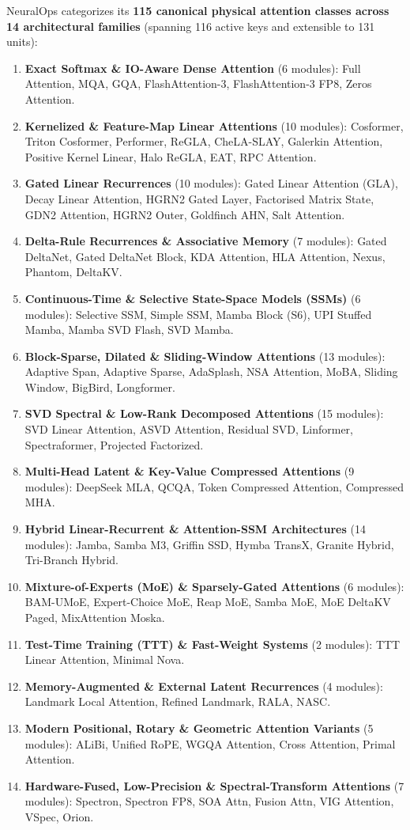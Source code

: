 \documentclass{article}
\begin{document}
NeuralOps categorizes its \textbf{115 canonical physical attention classes across 14 architectural families} (spanning 116 active keys and extensible to 131 units):
\begin{enumerate}
    \item \textbf{Exact Softmax \& IO-Aware Dense Attention} (6 modules): Full Attention, MQA, GQA, FlashAttention-3, FlashAttention-3 FP8, Zeros Attention.
    \item \textbf{Kernelized \& Feature-Map Linear Attentions} (10 modules): Cosformer, Triton Cosformer, Performer, ReGLA, CheLA-SLAY, Galerkin Attention, Positive Kernel Linear, Halo ReGLA, EAT, RPC Attention.
    \item \textbf{Gated Linear Recurrences} (10 modules): Gated Linear Attention (GLA), Decay Linear Attention, HGRN2 Gated Layer, Factorised Matrix State, GDN2 Attention, HGRN2 Outer, Goldfinch AHN, Salt Attention.
    \item \textbf{Delta-Rule Recurrences \& Associative Memory} (7 modules): Gated DeltaNet, Gated DeltaNet Block, KDA Attention, HLA Attention, Nexus, Phantom, DeltaKV.
    \item \textbf{Continuous-Time \& Selective State-Space Models (SSMs)} (6 modules): Selective SSM, Simple SSM, Mamba Block (S6), UPI Stuffed Mamba, Mamba SVD Flash, SVD Mamba.
    \item \textbf{Block-Sparse, Dilated \& Sliding-Window Attentions} (13 modules): Adaptive Span, Adaptive Sparse, AdaSplash, NSA Attention, MoBA, Sliding Window, BigBird, Longformer.
    \item \textbf{SVD Spectral \& Low-Rank Decomposed Attentions} (15 modules): SVD Linear Attention, ASVD Attention, Residual SVD, Linformer, Spectraformer, Projected Factorized.
    \item \textbf{Multi-Head Latent \& Key-Value Compressed Attentions} (9 modules): DeepSeek MLA, QCQA, Token Compressed Attention, Compressed MHA.
    \item \textbf{Hybrid Linear-Recurrent \& Attention-SSM Architectures} (14 modules): Jamba, Samba M3, Griffin SSD, Hymba TransX, Granite Hybrid, Tri-Branch Hybrid.
    \item \textbf{Mixture-of-Experts (MoE) \& Sparsely-Gated Attentions} (6 modules): BAM-UMoE, Expert-Choice MoE, Reap MoE, Samba MoE, MoE DeltaKV Paged, MixAttention Moska.
    \item \textbf{Test-Time Training (TTT) \& Fast-Weight Systems} (2 modules): TTT Linear Attention, Minimal Nova.
    \item \textbf{Memory-Augmented \& External Latent Recurrences} (4 modules): Landmark Local Attention, Refined Landmark, RALA, NASC.
    \item \textbf{Modern Positional, Rotary \& Geometric Attention Variants} (5 modules): ALiBi, Unified RoPE, WGQA Attention, Cross Attention, Primal Attention.
    \item \textbf{Hardware-Fused, Low-Precision \& Spectral-Transform Attentions} (7 modules): Spectron, Spectron FP8, SOA Attn, Fusion Attn, VIG Attention, VSpec, Orion.
\end{enumerate}
\end{document}
